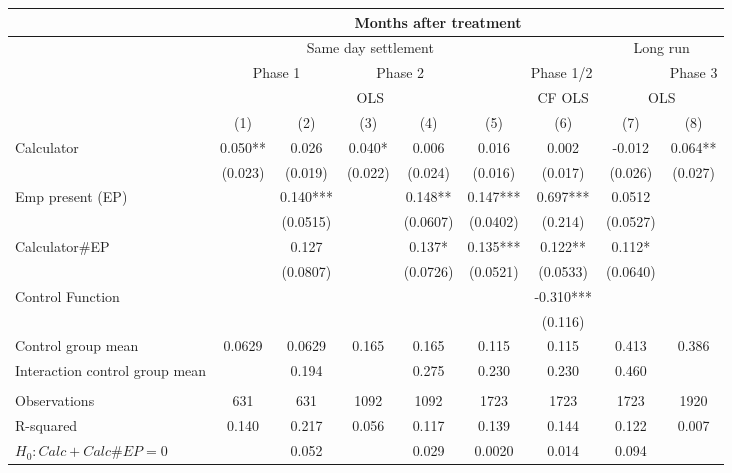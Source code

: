 \begin{tabular}{lcccccccc}
\toprule
\multicolumn{1}{|r}{} & \multicolumn{7}{c}{Months after treatment}            &  \\
\midrule
\multicolumn{1}{r|}{} & \multicolumn{5}{c}{Same day settlement} & \multicolumn{1}{c|}{} & \multicolumn{2}{c}{Long run} \\
\midrule
\midrule
\multicolumn{1}{r|}{} & \multicolumn{2}{c|}{Phase 1} & \multicolumn{2}{c|}{Phase 2} & \multicolumn{3}{c|}{Phase 1/2} & Phase 3 \\
\midrule
\multicolumn{1}{r|}{} & \multicolumn{5}{c|}{OLS}              & \multicolumn{1}{c|}{CF OLS} & \multicolumn{2}{c}{OLS} \\
\midrule
\midrule
      & (1)   & (2)   & (3)   & (4)   & (5)   & (6)   & (7)   & (8) \\
Calculator  & 0.050** & 0.026 & 0.040* & 0.006 & 0.016 & 0.002 & -0.012 & 0.064** \\
      & (0.023) & (0.019) & (0.022) & (0.024) & (0.016) & (0.017) & (0.026) & (0.027) \\
Emp present (EP) &       & 0.140*** &       & 0.148** & 0.147*** & 0.697*** & 0.0512 &  \\
      &       & (0.0515) &       & (0.0607) & (0.0402) & (0.214) & (0.0527) &  \\
Calculator\#EP &       & 0.127 &       & 0.137* & 0.135*** & 0.122** & 0.112* &  \\
      &       & (0.0807) &       & (0.0726) & (0.0521) & (0.0533) & (0.0640) &  \\
Control Function &       &       &       &       &       & -0.310*** &       &  \\
      &       &       &       &       &       & (0.116) &       &  \\
\midrule
Control group mean & 0.0629 & 0.0629 & 0.165 & 0.165 & 0.115 & 0.115 & 0.413 & 0.386 \\
Interaction control group mean &       & 0.194 &       & 0.275 & 0.230 & 0.230 & 0.460 &  \\
\midrule
      &       &       &       &       &       &       &       &  \\
\midrule
Observations & 631   & 631   & 1092  & 1092  & 1723  & 1723  & 1723  & 1920 \\
R-squared & 0.140 & 0.217 & 0.056 & 0.117 & 0.139 & 0.144 & 0.122 & 0.007 \\
$H_0 : Calc + Calc\# EP = 0$ &       & 0.052 &       & 0.029 & 0.0020 & 0.014 & 0.094 &  \\
\midrule


\end{tabular}
